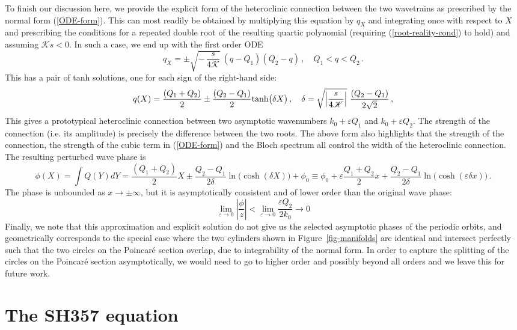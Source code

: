 \documentclass[10pt]{article}
\def\eps{{\varepsilon}} \def\reps{\textcolor{red}{{\varepsilon}}}
\begin{document}
To finish our discussion here, we provide the explicit form of the heteroclinic
connection between the two wavetrains as prescribed by the normal form
(\ref{ODE-form}). This can most readily be obtained by multiplying this equation
by $q_X$ and integrating once with respect to $X$ and prescribing the conditions
for a repeated double root of the resulting quartic polynomial (requiring
(\ref{root-reality-cond}) to hold) and assuming $\mathscr{K} s <0$. In such a
case, we end up with the first order ODE
\[
q_X = \pm \sqrt{-\, \frac{s}{4\mathscr{K}}} \ (q-Q_1)(Q_2-q)\,, \quad Q_1<q<Q_2\,.
\]
%
This has a pair of tanh solutions, one for each sign of the right-hand side:
%
\[
q(X) = \frac{(Q_1+Q_2)}{2} \pm \frac{ (Q_2-Q_1)}{2}{\rm tanh}\big(\delta X\big)\,,\quad \delta = \sqrt{\left\vert\frac{s}{4\mathscr{K}} \right\vert} \ {}\frac{(Q_2-Q_1)}{2\sqrt{2}}\,,
\]
%
This gives a prototypical heteroclinic connection between two asymptotic
wavenumbers $k_0+\eps Q_1$ and $k_0+\eps Q_2$. The strength of the connection
(i.e. its amplitude) is precisely the difference between the two roots. The
above form also highlights that the strength of the connection, the strength of
the cubic term in (\ref{ODE-form}) and the Bloch spectrum all control the width
of the heteroclinic connection. The resulting perturbed wave phase is
%
\[
\phi(X) = \int Q(Y)dY = \frac{(Q_1+Q_2)}{2} X\pm\frac{Q_2-Q_1}{2\delta}\ln \big(\cosh(\delta X)\big)+\phi_0 \equiv \phi_0+\eps \frac{Q_1+Q_2}{2} x+\frac{Q_2-Q_1}{2\delta}\ln \big(\cosh(\eps \delta x)\big)\,.
\]
%
The phase is unbounded as $x\to\pm\infty$, but it is asymptotically consistent and of lower order than the original wave phase:
%
    \[
    \lim_{\eps \to 0} \left\vert \frac{\phi}{z}\right \vert <\lim_{\eps \to 0} \frac{\eps Q_2}{2k_0} \to 0
    \]
%
Finally, we note that this approximation and explicit solution do not give us the selected asymptotic phases of the periodic orbits, and geometrically corresponds to the
special case where the two cylinders shown in Figure~\ref{fig-manifolds} are
identical and intersect perfectly such that the two circles on the Poincar\'e
section overlap, due to integrability of the normal form. In order to capture the splitting of the circles on the
Poincar\'e section asymptotically, we would need to go to higher order and
possibly beyond all orders and we leave this for future work. 

\section{The SH357 equation}
\setcounter{equation}{0}
\label{sec-SH357-review}
\end{document}

